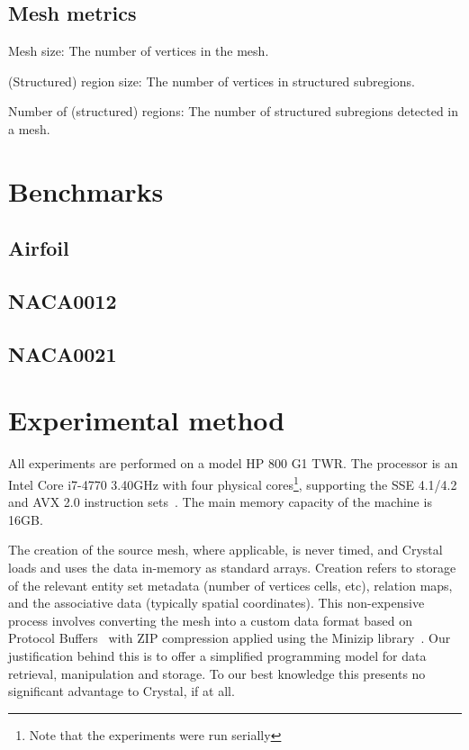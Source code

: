 \subsection{Mesh metrics}
Mesh size:
The number of vertices in the mesh.

(Structured) region size:
The number of vertices in structured subregions.

Number of (structured) regions:
The number of structured subregions detected in a mesh.


\section{Benchmarks}
\subsection{Airfoil}
\subsection{NACA0012}
\subsection{NACA0021}

\section{Experimental method}
All experiments are performed on a model HP 800 G1 TWR. The processor is an Intel\textregistered{} Core\texttrademark{} i7-4770 3.40GHz with four physical cores\footnote{Note that the experiments were run serially}, supporting the SSE 4.1/4.2 and  AVX 2.0 instruction sets~\cite{intelprocessor}. The main memory capacity of the machine is 16GB.

The creation of the source mesh, where applicable, is never timed, and Crystal loads and uses the data in-memory as standard arrays. Creation refers to storage of the relevant entity set metadata (number of vertices cells, etc), relation maps, and the associative data (typically spatial coordinates). This non-expensive process involves converting the mesh into a custom data format based on Protocol Buffers~\cite{protocolbuffers} with ZIP compression applied using the Minizip library~\cite{minizip}. Our justification behind this is to offer a simplified programming model for data retrieval, manipulation and storage. To our best knowledge this presents no significant advantage to Crystal, if at all.

